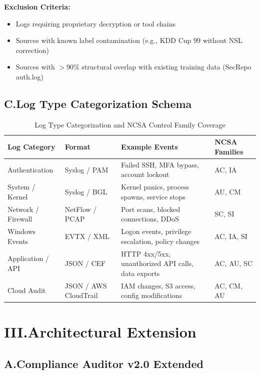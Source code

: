 \documentclass[12pt]{article}
\begin{document}
\textbf{Exclusion Criteria:}
\begin{itemize}
    \item Logs requiring proprietary decryption or tool chains
    \item Sources with known label contamination (e.g., KDD Cup 99 without NSL correction)
    \item Sources with $>$90\% structural overlap with existing training data (SecRepo auth.log)
\end{itemize}

\subsection*{C.\quad Log Type Categorization Schema}

\begin{table}[h]
\centering
\caption{Log Type Categorization and NCSA Control Family Coverage}
\label{tab:log_types}
\begin{tabular}{@{}p{3cm}p{3cm}p{4cm}p{3cm}@{}}
\toprule
\textbf{Log Category} & \textbf{Format} & \textbf{Example Events} & \textbf{NCSA Families} \\
\midrule
Authentication & Syslog / PAM & Failed SSH, MFA bypass, account lockout & AC, IA \\
System / Kernel & Syslog / BGL & Kernel panics, process spawns, service stops & AU, CM \\
Network / Firewall & NetFlow / PCAP & Port scans, blocked connections, DDoS & SC, SI \\
Windows Events & EVTX / XML & Logon events, privilege escalation, policy changes & AC, IA, SI \\
Application / API & JSON / CEF & HTTP 4xx/5xx, unauthorized API calls, data exports & AC, AU, SC \\
Cloud Audit & JSON / AWS CloudTrail & IAM changes, S3 access, config modifications & AC, CM, AU \\
\bottomrule
\end{tabular}
\end{table}

\bigskip

\section*{III.\quad Architectural Extension}

\subsection*{A.\quad Compliance Auditor v2.0 Extended}
\end{document}
